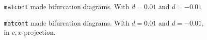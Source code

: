 \begin{figure}


\caption{\texttt{matcont} made bifurcation diagrams. With $d = 0.01$ and $d=-0.01$}
\label{fig:matcontdne0}


\caption{\texttt{matcont} made bifurcation diagrams. With $d = 0.01$ and $d=-0.01$, in $c,x$ projection.}
\end{figure}


